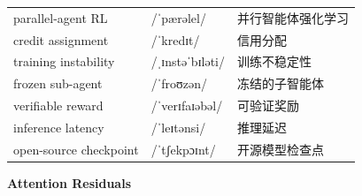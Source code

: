 \documentclass[UTF8,12pt,a4paper]{ctexart}
\providecommand{\zh}[1]{#1}
\begin{document}
\begin{tabular*}{\textwidth}{@{\extracolsep{\fill}}lll@{}}
parallel-agent RL & {\ipafont /ˈpærəlel/} & \zh{并行智能体强化学习} \\
credit assignment & {\ipafont /ˈkredɪt/} & \zh{信用分配} \\
training instability & {\ipafont /ˌɪnstəˈbɪləti/} & \zh{训练不稳定性} \\
frozen sub-agent & {\ipafont /ˈfroʊzən/} & \zh{冻结的子智能体} \\
verifiable reward & {\ipafont /ˈverɪfaɪəbəl/} & \zh{可验证奖励} \\
inference latency & {\ipafont /ˈleɪtənsi/} & \zh{推理延迟} \\
open-source checkpoint & {\ipafont /ˈtʃekpɔɪnt/} & \zh{开源模型检查点} \\
\bottomrule
\end{tabular*}

\newpage

\begin{center}
    {\Large\bfseries Attention Residuals}
\end{center}
\end{document}
